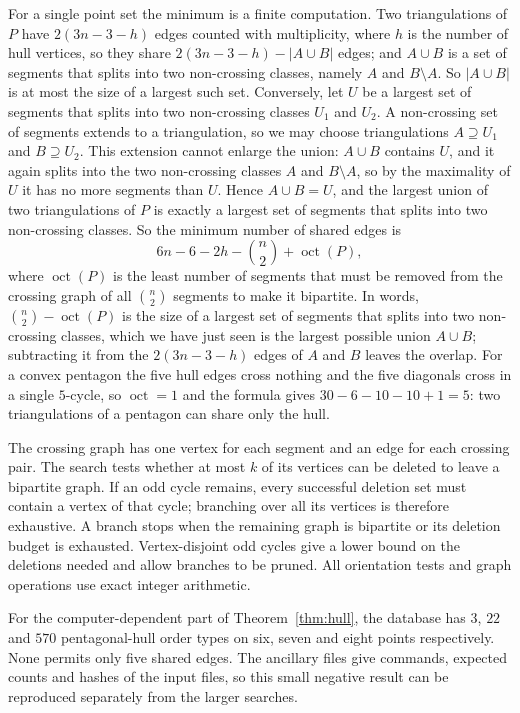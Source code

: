 \documentclass[11pt]{amsart}
\theoremstyle{definition}
\begin{document}
For a single point set the minimum is a finite computation. Two triangulations of $P$ have $2(3n-3-h)$ edges counted with multiplicity, where $h$ is the number of hull vertices, so they share $2(3n-3-h)-|A\cup B|$ edges; and $A\cup B$ is a set of segments that splits into two non-crossing classes, namely $A$ and $B\setminus A$. So $|A\cup B|$ is at most the size of a largest such set. Conversely, let $U$ be a largest set of segments that splits into two non-crossing classes $U_1$ and $U_2$. A non-crossing set of segments extends to a triangulation, so we may choose triangulations $A\supseteq U_1$ and $B\supseteq U_2$. This extension cannot enlarge the union: $A\cup B$ contains $U$, and it again splits into the two non-crossing classes $A$ and $B\setminus A$, so by the maximality of $U$ it has no more segments than $U$. Hence $A\cup B=U$, and the largest union of two triangulations of $P$ is exactly a largest set of segments that splits into two non-crossing classes. So the minimum number of shared edges is
\[
6n-6-2h-\binom n2+\operatorname{oct}(P),
\]
where $\operatorname{oct}(P)$ is the least number of segments that must be removed from the crossing graph of all $\binom n2$ segments to make it bipartite. In words, $\binom n2-\operatorname{oct}(P)$ is the size of a largest set of segments that splits into two non-crossing classes, which we have just seen is the largest possible union $A\cup B$; subtracting it from the $2(3n-3-h)$ edges of $A$ and $B$ leaves the overlap. For a convex pentagon the five hull edges cross nothing and the five diagonals cross in a single $5$-cycle, so $\operatorname{oct}=1$ and the formula gives $30-6-10-10+1=5$: two triangulations of a pentagon can share only the hull.

The crossing graph has one vertex for each segment and an edge for each crossing pair. The search tests whether at most $k$ of its vertices can be deleted to leave a bipartite graph. If an odd cycle remains, every successful deletion set must contain a vertex of that cycle; branching over all its vertices is therefore exhaustive. A branch stops when the remaining graph is bipartite or its deletion budget is exhausted. Vertex-disjoint odd cycles give a lower bound on the deletions needed and allow branches to be pruned. All orientation tests and graph operations use exact integer arithmetic.

For the computer-dependent part of Theorem~\ref{thm:hull}, the database has $3$, $22$ and $570$ pentagonal-hull order types on six, seven and eight points respectively. None permits only five shared edges. The ancillary files give commands, expected counts and hashes of the input files, so this small negative result can be reproduced separately from the larger searches.
\end{document}
